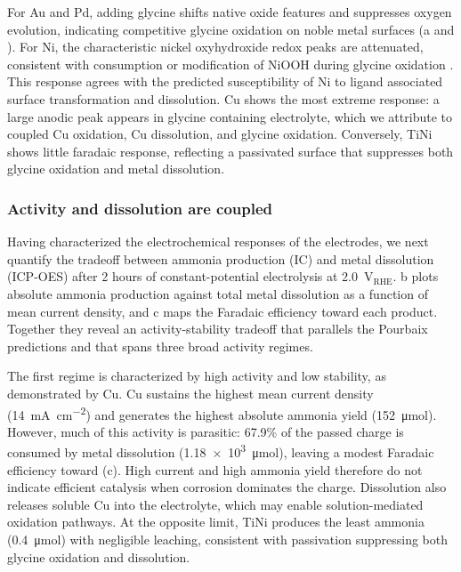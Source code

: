 \documentclass[twoside,twocolumn,9pt]{article}
\begin{document}
For Au and Pd, adding glycine shifts native oxide features and suppresses oxygen evolution, indicating competitive glycine oxidation on noble metal surfaces \cite{Chadderdon2014,Arulmani2019} (a and ). For Ni, the characteristic nickel oxyhydroxide redox peaks are attenuated, consistent with consumption or modification of NiOOH during glycine oxidation \cite{Boggs2009}. This response agrees with the predicted susceptibility of Ni to ligand associated surface transformation and dissolution. Cu shows the most extreme response: a large anodic peak appears in glycine containing electrolyte, which we attribute to coupled Cu oxidation, Cu dissolution, and glycine oxidation. Conversely, TiNi shows little faradaic response, reflecting a passivated surface that suppresses both glycine oxidation and metal dissolution.

\subsubsection{Activity and dissolution are coupled}

Having characterized the electrochemical responses of the electrodes, we next quantify the tradeoff between ammonia production (IC) and metal dissolution (ICP-OES) after 2 hours of constant-potential electrolysis at 2.0~V$_{\mathrm{RHE}}$. b plots absolute ammonia production against total metal dissolution as a function of mean current density, and c maps the Faradaic efficiency toward each product. Together they reveal an activity-stability tradeoff that parallels the Pourbaix predictions and that spans three broad activity regimes.


The first regime is characterized by high activity and low stability, as demonstrated by Cu. Cu sustains the highest mean current density (\SI{14}{\milli\ampere\per\square\centi\meter}) and generates the highest absolute ammonia yield (152~\si{\micro mol}). However, much of this activity is parasitic: 67.9\% of the passed charge is consumed by metal dissolution (\num{1.18e3}~\si{\micro mol}), leaving a modest Faradaic efficiency toward  (c). High current and high ammonia yield therefore do not indicate efficient catalysis when corrosion dominates the charge. Dissolution also releases soluble Cu into the electrolyte, which may enable solution-mediated oxidation pathways.  At the opposite limit, TiNi produces the least ammonia (0.4~\si{\micro mol}) with negligible leaching, consistent with passivation suppressing both glycine oxidation and dissolution.
\end{document}
